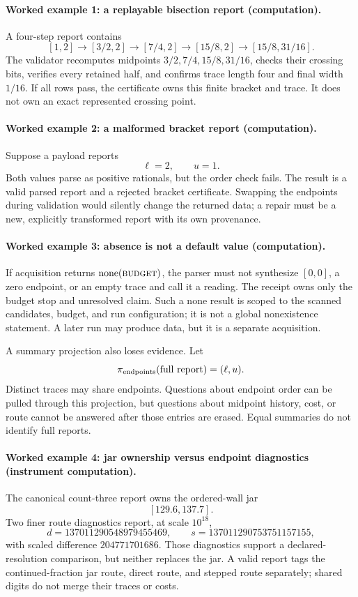 \paragraph{Worked example 1: a replayable bisection report (computation).}
A four-step report contains
\[
 [1,2]\to[3/2,2]\to[7/4,2]\to[15/8,2]\to[15/8,31/16].
\]
The validator recomputes midpoints \(3/2,7/4,15/8,31/16\), checks their crossing bits, verifies every retained half,
and confirms trace length four and final width \(1/16\).  If all rows pass, the certificate owns this finite bracket and
trace.  It does not own an exact represented crossing point.

\paragraph{Worked example 2: a malformed bracket report (computation).}
Suppose a payload reports
\[
                         \ell=2,\qquad u=1.
\]
Both values parse as positive rationals, but the order check fails.  The result is a valid parsed report and a rejected
bracket certificate.  Swapping the endpoints during validation would silently change the returned data; a repair must
be a new, explicitly transformed report with its own provenance.

\paragraph{Worked example 3: absence is not a default value (computation).}
If acquisition returns \(\operatorname{none}(\textsc{budget})\), the parser must not synthesize
\([0,0]\), a zero endpoint, or an empty trace and call it a reading.  The receipt owns only the budget stop and unresolved
claim.  Such a none result is scoped to the scanned candidates, budget, and run configuration; it is not a global
nonexistence statement.  A later run may produce data, but it is a separate acquisition.

A summary projection also loses evidence.  Let
\[
 \pi_{\rm endpoints}(\text{full report})=(\ell,u).
\]
Distinct traces may share endpoints.  Questions about endpoint order can be pulled through this projection, but
questions about midpoint history, cost, or route cannot be answered after those entries are erased.  Equal summaries do
not identify full reports.

\paragraph{Worked example 4: jar ownership versus endpoint diagnostics (instrument computation).}
The canonical count-three report owns the ordered-wall jar
\[
                         [129.6,137.7].
\]
Two finer route diagnostics report, at scale \(10^{18}\),
\[
 d=137011290548979455469,\qquad
 s=137011290753751157155,
\]
with scaled difference \(204771701686\).  Those diagnostics support a declared-resolution comparison, but neither
replaces the jar.  A valid report tags the continued-fraction jar route, direct route, and stepped route separately;
shared digits do not merge their traces or costs.

